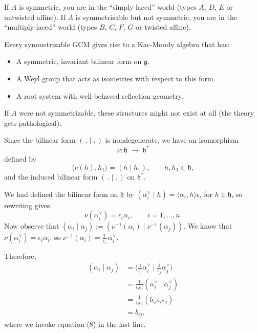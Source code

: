 \documentclass[12pt]{article}
\begin{document}
\begin{remark}
    If $A$ is symmetric, you are in the “simply-laced” world (types $A$, $D$, $E$ or untwisted affine). If $A$ is symmetrizable but not symmetric, you are in the “multiply-laced” world (types $B$, $C$, $F$, $G$ or twisted affine).

    Every symmetrizable GCM gives rise to a Kac-Moody algebra that has:
    \begin{itemize}
        \item A symmetric, invariant bilinear form on $\mathfrak{g}$.
        \item A Weyl group that acts as isometries with respect to this form.
        \item A root system with well-behaved reflection geometry.
    \end{itemize}

    If $A$ were not symmetrizable, these structures might not exist at all (the theory gets pathological).
\end{remark}

Since the bilinear form $(\,.\mid.\,)$ is nondegenerate, we have an isomorphism
\[
    \nu : \mathfrak{h} \;\to\; \mathfrak{h}^*
\]
defined by
\[
    \langle \nu(h), h_1 \rangle = (h \mid h_1),
    \qquad h,h_1 \in \mathfrak{h},
\]
and the induced bilinear form $(\,.\mid.\,)$ on $\mathfrak{h}^*$.

We had defined the bilinear form on $\mathfrak{h}$ by
$(\alpha_i^\vee \mid h) = \langle \alpha_i, h \rangle \epsilon_i$ for $h \in \mathfrak{h}$, so rewriting gives
\begin{equation}
    \nu(\alpha_i^\vee) = \epsilon_i \alpha_i,
    \qquad i=1,\ldots,n.
\end{equation}
Now observe that
$(\alpha_i \mid \alpha_j) := (\nu^{-1}(\alpha_i) \mid \nu^{-1}(\alpha_j))$. We know that $\nu(\alpha_i^\vee) = \epsilon_i \alpha_i$, so $\nu^{-1}(\alpha_i) = \tfrac{1}{\epsilon_i}\,\alpha_i^\vee$.

Therefore, \begin{align*}
    (\alpha_i \mid \alpha_j) & = \Big(\tfrac{1}{\epsilon_i}\alpha_i^\vee \;\Big|\; \tfrac{1}{\epsilon_j}\alpha_j^\vee \Big) \\
                             & = \frac{1}{\epsilon_i \epsilon_j} (\alpha_i^\vee \mid \alpha_j^\vee)                         \\
                             & = \frac{1}{\epsilon_i \epsilon_j} (b_{ij} \epsilon_i \epsilon_j)                             \\
                             & = b_{ij}.
\end{align*}
where we invoke equation (8) in the last line.
\end{document}
